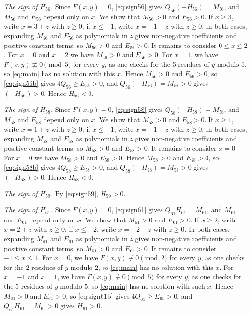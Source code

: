 \documentclass[11pt]{article}
\begin{document}
\emph{The sign of $H_{56}$.} Since $F(x,y)=0$, \eqref{eq:sign56} gives $Q_{56}(-H_{56})=M_{56}$, and $M_{56}$ and $E_{56}$ depend only on $x$. We show that $M_{56}>0$ and $E_{56}>0$. If $x\geq3$, write $x=3+z$ with $z\geq0$; if $x\leq-1$, write $x=-1-z$ with $z\geq0$. In both cases, expanding $M_{56}$ and $E_{56}$ as polynomials in $z$ gives non-negative coefficients and positive constant terms, so $M_{56}>0$ and $E_{56}>0$. It remains to consider $0\leq x\leq2$. For $x=0$ and $x=2$ we have $M_{56}>0$ and $E_{56}>0$. For $x=1$, we have $F(x,y)\not\equiv0\pmod{5}$ for every $y$, as one checks for the 5 residues of $y$ modulo $5$, so \eqref{eq:main} has no solution with this $x$. Hence $M_{56}>0$ and $E_{56}>0$, so \eqref{eq:sign56b} gives $4Q_{56}\geq E_{56}>0$, and $Q_{56}(-H_{56})=M_{56}>0$ gives $(-H_{56})>0$. Hence $H_{56}<0$.

\emph{The sign of $H_{58}$.} Since $F(x,y)=0$, \eqref{eq:sign58} gives $Q_{58}(-H_{58})=M_{58}$, and $M_{58}$ and $E_{58}$ depend only on $x$. We show that $M_{58}>0$ and $E_{58}>0$. If $x\geq1$, write $x=1+z$ with $z\geq0$; if $x\leq-1$, write $x=-1-z$ with $z\geq0$. In both cases, expanding $M_{58}$ and $E_{58}$ as polynomials in $z$ gives non-negative coefficients and positive constant terms, so $M_{58}>0$ and $E_{58}>0$. It remains to consider $x=0$. For $x=0$ we have $M_{58}>0$ and $E_{58}>0$. Hence $M_{58}>0$ and $E_{58}>0$, so \eqref{eq:sign58b} gives $4Q_{58}\geq E_{58}>0$, and $Q_{58}(-H_{58})=M_{58}>0$ gives $(-H_{58})>0$. Hence $H_{58}<0$.

\emph{The sign of $H_{59}$.} By \eqref{eq:sign59}, $H_{59}>0$.

\emph{The sign of $H_{61}$.} Since $F(x,y)=0$, \eqref{eq:sign61} gives $Q_{61}H_{61}=M_{61}$, and $M_{61}$ and $E_{61}$ depend only on $x$. We show that $M_{61}>0$ and $E_{61}>0$. If $x\geq2$, write $x=2+z$ with $z\geq0$; if $x\leq-2$, write $x=-2-z$ with $z\geq0$. In both cases, expanding $M_{61}$ and $E_{61}$ as polynomials in $z$ gives non-negative coefficients and positive constant terms, so $M_{61}>0$ and $E_{61}>0$. It remains to consider $-1\leq x\leq1$. For $x=0$, we have $F(x,y)\not\equiv0\pmod{2}$ for every $y$, as one checks for the 2 residues of $y$ modulo $2$, so \eqref{eq:main} has no solution with this $x$. For $x=-1$ and $x=1$, we have $F(x,y)\not\equiv0\pmod{5}$ for every $y$, as one checks for the 5 residues of $y$ modulo $5$, so \eqref{eq:main} has no solution with such $x$. Hence $M_{61}>0$ and $E_{61}>0$, so \eqref{eq:sign61b} gives $4Q_{61}\geq E_{61}>0$, and $Q_{61}H_{61}=M_{61}>0$ gives $H_{61}>0$.
\end{document}
